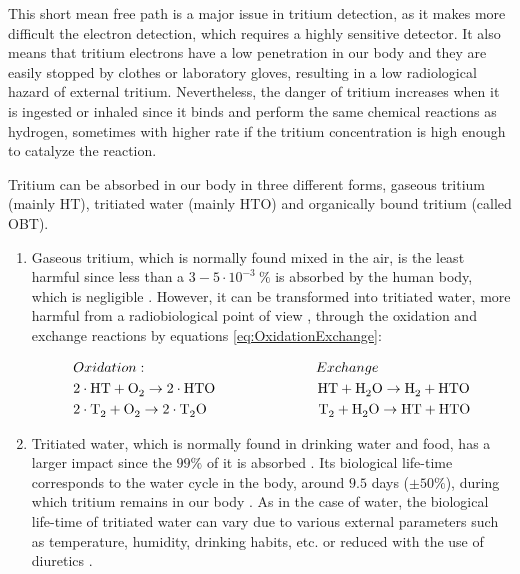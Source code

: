 This short mean free path is a major issue in tritium detection, as it makes more difficult the electron detection, which requires a highly sensitive detector. It also means that tritium electrons have a low penetration in our body and they are easily stopped by clothes or laboratory gloves, resulting in a low radiological hazard of external tritium. Nevertheless, the danger of tritium increases when it is ingested or inhaled since it binds and perform the same chemical reactions as hydrogen, sometimes with higher rate if the tritium concentration is high enough to catalyze the reaction. 

Tritium can be absorbed in our body in three different forms, gaseous tritium (mainly HT), tritiated water (mainly HTO) and organically bound tritium (called OBT).

\begin{enumerate}
\item{} Gaseous tritium, which is normally found mixed in the air, is the least harmful since less than a $3-5 \cdot{} 10^{-3}~\%$ is absorbed by the human body, which is negligible \cite{TritiumHandling}. However, it can be transformed into tritiated water, more harmful from a radiobiological point of view \cite{TritiumHandling}, through the oxidation and exchange reactions by equations \ref{eq:OxidationExchange}:

\begin{equation}
\begin{split}
& Oxidation: \qquad \qquad \qquad \qquad \qquad \qquad Exchange\\
& 2\cdot{}\ce{HT} + \ce{O_2} \rightarrow 2 \cdot{} \ce{HTO} ~ \quad \qquad \qquad \qquad \ce{HT} + \ce{H_2 O} \rightarrow \ce{H_2} + \ce{HTO}\\
& 2\cdot{}\ce{T_2} + \ce{O_2} \rightarrow 2 \cdot{} \ce{T_2 O} \qquad \qquad \qquad \qquad \ce{T_2} + \ce{H_2 O} \rightarrow \ce{HT} + \ce{HTO}
\label{eq:OxidationExchange}
\end{split}
\end{equation}

\item{} Tritiated water, which is normally found in drinking water and food, has a larger impact since the $99\%$ of it is absorbed \cite{TritiumHandling}. Its biological life-time corresponds to the water cycle in the body, around $9.5$ days ($\pm50\%$), during which tritium remains in our body \cite{TritiumHandling, FranceTritiumEnvironment, EstimationTritiumDosi}. As in the case of water, the biological life-time of tritiated water can vary due to various external parameters such as temperature, humidity, drinking habits, etc. or reduced with the use of diuretics \cite{TritiumHandling}.


\end{enumerate}
